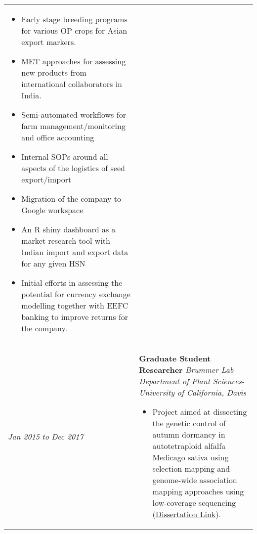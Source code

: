 ﻿\documentclass[a4paper]{article}
\begin{document}
\begin{tabular}{p{3cm} p{14cm}}
\begin{itemize}[noitemsep,topsep=0pt]
  \item Early stage breeding programs for various OP crops for Asian export markers. 
  \item MET approaches for assessing new products from international collaborators in India.
  \item Semi-automated workflows for farm management/monitoring and office accounting 
  \item Internal SOPs around all aspects of the logistics of seed export/import 
  \item Migration of the company to Google workspace 
  \item An R shiny dashboard as a market research tool with Indian import and export data for any given HSN 
  \item Initial efforts in assessing the potential for currency exchange modelling together with EEFC banking to improve returns for the company.
\end{itemize}
%
\\
%
\vspace{0pt} 
\textit{Jan 2015}\newline
\textit{to}\newline
\textit{Dec 2017}\newline
& 
\vspace{0pt}
\textbf{Graduate Student Researcher}\newline
\textit{Brummer Lab}\newline
\textit{Department of Plant Sciences-University of California, Davis}
\begin{itemize}[noitemsep,topsep=0pt]
  \item Project aimed at dissecting the genetic control of autumn dormancy in autotetraploid alfalfa Medicago sativa using selection mapping and genome-wide association mapping approaches using low-coverage sequencing (\href{http://tinyurl.com/grmunjal-disseration}{Dissertation Link}). 
  
\end{itemize}
\end{tabular}
\end{document}
